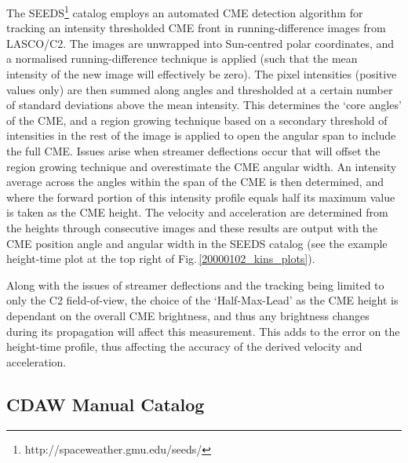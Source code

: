 \documentclass[referee,a4paper,12pt,traditabstract]{swsc}
\begin{document}
\begin{linenumbers}
The SEEDS\footnote{http://spaceweather.gmu.edu/seeds/} catalog employs an automated CME detection algorithm for tracking an intensity thresholded CME front in running-difference images from LASCO/C2. The images are unwrapped into Sun-centred polar coordinates, and a normalised running-difference technique is applied (such that the mean intensity of the new image will effectively be zero). The pixel intensities (positive values only) are then summed along angles and thresholded at a certain number of standard deviations above the mean intensity. This determines the `core angles' of the CME, and a region growing technique based on a secondary threshold of intensities in the rest of the image is applied to open the angular span to include the full CME. Issues arise when streamer deflections occur that will offset the region growing technique and overestimate the CME angular width. An intensity average across the angles within the span of the CME is then determined, and where the forward portion of this intensity profile equals half its maximum value is taken as the CME height. The velocity and acceleration are determined from the heights through consecutive images and these results are output with the CME position angle and angular width in the SEEDS catalog (see the example height-time plot at the top right of Fig.\,\ref{20000102_kins_plots}).

Along with the issues of streamer deflections and the tracking being limited to only the C2 field-of-view, the choice of the `Half-Max-Lead' as the CME height is dependant on the overall CME brightness, and thus any brightness changes during its propagation will affect this measurement. This adds to the error on the height-time profile, thus affecting the accuracy of the derived velocity and acceleration.

\subsection{CDAW Manual Catalog}


\end{linenumbers}
\end{document}
